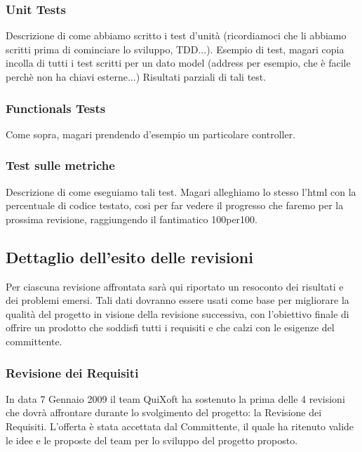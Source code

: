 \documentclass[11pt,a4paper]{article}
\begin{document}
\subsubsection{Unit Tests}
Descrizione di come abbiamo scritto i test d'unità (ricordiamoci che li abbiamo scritti prima di cominciare lo sviluppo, TDD...).
Esempio di test, magari copia incolla di tutti i test scritti per un dato model (address per esempio, che è facile perchè non ha chiavi esterne...)
Risultati parziali di tali test.
\subsubsection{Functionals Tests}
Come sopra, magari prendendo d'esempio un particolare controller.
\subsubsection{Test sulle metriche}
Descrizione di come eseguiamo tali test. Magari alleghiamo lo stesso l'html con la percentuale di codice testato, cosi per far vedere il progresso che faremo per la prossima revisione, raggiungendo il fantimatico 100per100.
\subsection{Dettaglio dell'esito delle revisioni}
Per ciascuna revisione affrontata sarà qui riportato un resoconto dei risultati e dei problemi emersi. Tali dati dovranno essere usati come base per migliorare la qualità del progetto in visione della revisione successiva, con l'obiettivo finale di offrire un prodotto che soddisfi tutti i requisiti e che calzi con le esigenze del committente.
\subsubsection{Revisione dei Requisiti}
In data 7 Gennaio 2009 il team QuiXoft ha sostenuto la prima delle 4 revisioni che dovrà affrontare durante lo svolgimento del progetto: la Revisione dei Requisiti.
L'offerta è stata accettata dal Committente, il quale ha ritenuto valide le idee e le proposte del team per lo sviluppo del progetto proposto.
\end{document}
